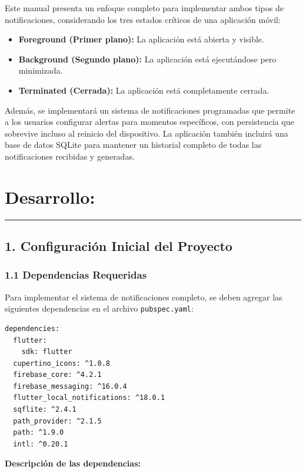 \documentclass[12pt,a4paper]{article}
\newcommand{\grayline}{\noindent\textcolor{gray}{\rule{\textwidth}{1pt}}}
\begin{document}
Este manual presenta un enfoque completo para implementar ambos tipos de notificaciones, considerando los tres estados críticos de una aplicación móvil:

\begin{itemize}
    \item \textbf{Foreground (Primer plano):} La aplicación está abierta y visible.
    \item \textbf{Background (Segundo plano):} La aplicación está ejecutándose pero minimizada.
    \item \textbf{Terminated (Cerrada):} La aplicación está completamente cerrada.
\end{itemize}

Además, se implementará un sistema de notificaciones programadas que permite a los usuarios configurar alertas para momentos específicos, con persistencia que sobrevive incluso al reinicio del dispositivo. La aplicación también incluirá una base de datos SQLite para mantener un historial completo de todas las notificaciones recibidas y generadas.

\vspace{1cm}

\section*{Desarrollo:}
\grayline{}
\vspace{0.3cm}

\subsection*{1. Configuración Inicial del Proyecto}

\subsubsection*{1.1 Dependencias Requeridas}

Para implementar el sistema de notificaciones completo, se deben agregar las siguientes dependencias en el archivo \texttt{pubspec.yaml}:

\begin{verbatim}
dependencies:
  flutter:
    sdk: flutter
  cupertino_icons: ^1.0.8
  firebase_core: ^4.2.1
  firebase_messaging: ^16.0.4
  flutter_local_notifications: ^18.0.1
  sqflite: ^2.4.1
  path_provider: ^2.1.5
  path: ^1.9.0
  intl: ^0.20.1
\end{verbatim}

\textbf{Descripción de las dependencias:}
\end{document}
